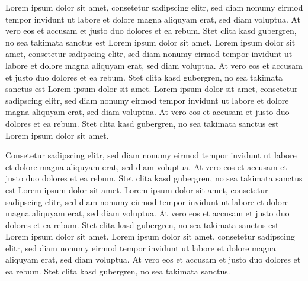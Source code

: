 Lorem ipsum dolor sit amet, consetetur sadipscing elitr, sed diam nonumy eirmod tempor invidunt ut labore et dolore magna aliquyam erat, sed diam voluptua. At vero eos et accusam et justo duo dolores et ea rebum. Stet clita kasd gubergren, no sea takimata sanctus est Lorem ipsum dolor sit amet. Lorem ipsum dolor sit amet, consetetur sadipscing elitr, sed diam nonumy eirmod tempor invidunt ut labore et dolore magna aliquyam erat, sed diam voluptua. At vero eos et accusam et justo duo dolores et ea rebum. Stet clita kasd gubergren, no sea takimata sanctus est Lorem ipsum dolor sit amet. Lorem ipsum dolor sit amet, consetetur sadipscing elitr, sed diam nonumy eirmod tempor invidunt ut labore et dolore magna aliquyam erat, sed diam voluptua. At vero eos et accusam et justo duo dolores et ea rebum. Stet clita kasd gubergren, no sea takimata sanctus est Lorem ipsum dolor sit amet.

Consetetur sadipscing elitr, sed diam nonumy eirmod tempor invidunt ut labore et dolore magna aliquyam erat, sed diam voluptua. At vero eos et accusam et justo duo dolores et ea rebum. Stet clita kasd gubergren, no sea takimata sanctus est Lorem ipsum dolor sit amet. Lorem ipsum dolor sit amet, consetetur sadipscing elitr, sed diam nonumy eirmod tempor invidunt ut labore et dolore magna aliquyam erat, sed diam voluptua. At vero eos et accusam et justo duo dolores et ea rebum. Stet clita kasd gubergren, no sea takimata sanctus est Lorem ipsum dolor sit amet. Lorem ipsum dolor sit amet, consetetur sadipscing elitr, sed diam nonumy eirmod tempor invidunt ut labore et dolore magna aliquyam erat, sed diam voluptua. At vero eos et accusam et justo duo dolores et ea rebum. Stet clita kasd gubergren, no sea takimata sanctus.